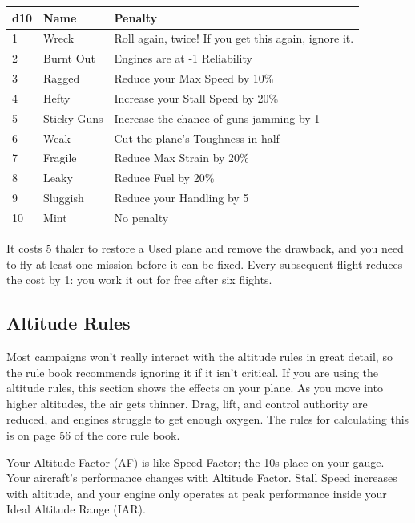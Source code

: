 \documentclass{article}
\begin{document}
\begin{tabular}{|l|l|l|}
    \hline
    d10 & Name        & Penalty                                              \\\hline
    1   & Wreck       & Roll again, twice! If you get this again, ignore it. \\\hline
    2   & Burnt Out   & Engines are at -1 Reliability                        \\\hline
    3   & Ragged      & Reduce your Max Speed by 10\%                        \\\hline
    4   & Hefty       & Increase your Stall Speed by 20\%                    \\\hline
    5   & Sticky Guns & Increase the chance of guns jamming by 1             \\\hline
    6   & Weak        & Cut the plane's Toughness in half                    \\\hline
    7   & Fragile     & Reduce Max Strain by 20\%                            \\\hline
    8   & Leaky       & Reduce Fuel by 20\%                                  \\\hline
    9   & Sluggish    & Reduce your Handling by 5                            \\\hline
    10  & Mint        & No penalty                                           \\\hline
\end{tabular}

It costs 5 thaler to restore a Used plane and remove the
drawback, and you need to fly at least one mission before it can be
fixed. Every subsequent flight reduces the cost by 1: you work it out
for free after six flights.

\subsection{Altitude Rules}
\label{_Altitude_Rules}

Most campaigns won't really interact with the altitude rules in great
detail, so the rule book recommends ignoring it if it isn't critical. If
you are using the altitude rules, this section shows the effects on your
plane. As you move into higher altitudes, the air gets thinner. Drag,
lift, and control authority are reduced, and engines struggle to get
enough oxygen. The rules for calculating this is on page 56 of the core
rule book.

Your Altitude Factor (AF) is like Speed Factor; the 10s place on your
gauge. Your aircraft's performance changes with Altitude Factor. Stall
Speed increases with altitude, and your engine only operates at peak
performance inside your Ideal Altitude Range (IAR).
\end{document}
